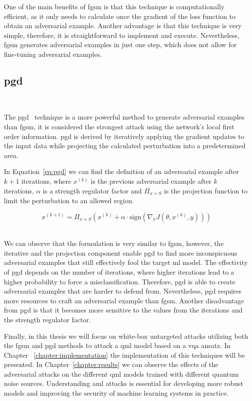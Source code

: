 One of the main benefits of \ac{fgsm} is that this technique
is computationally efficient, as it only needs to calculate
once the gradient of the loss function to obtain an adversarial
example. Another advantage is that this technique is very simple,
therefore, it is straightforward to implement and execute.
Nevertheless, \ac{fgsm} generates adversarial examples in just
one step, which does not allow for fine-tuning adversarial
examples. \

\subsection{\acl{pgd}}\label{subsection:pgd} \

The \ac{pgd}~\cite{madry_towards_2019} technique is a more
powerful method to generate adversarial examples than \ac{fgsm},
it is considered the strongest attack using the network's local
first order information. \ac{pgd} is derived by iteratively
applying the gradient updates to the input data while projecting
the calculated perturbation into a predetermined area. \

In Equation~\ref{eq:pgd} we can find the definition of an
adversarial example after \(k+1\) iterations, where \(x^{(k)}\)
is the previous adversarial example after \(k\) iterations,
\(\alpha\) is a strength regulator factor and \(\Pi_{x+S}\)
is the projection function to limit the perturbation to
an allowed region. \

\begin{equation}\label{eq:pgd}
  x^{(k+1)} = \Pi_{x+S} \left( x^{(k)} + \alpha \cdot \text{sign}(\nabla_x J(\theta, x^{(k)}, y)) \right)
\end{equation} \

We can observe that the formulation is very similar to \ac{fgsm},
however, the iterative and the projection component enable \ac{pgd}
to find more inconspicuous adversarial examples that still effectively
fool the target \ac{ml} model. The effectivity of \ac{pgd} depends
on the number of iterations, where higher iterations lead to a higher
probability to force a misclassification. Therefore, \ac{pgd} is able to
create adversarial examples that are harder to defend from.
Nevertheless, \ac{pgd} requires more resources to craft an
adversarial example than \ac{fgsm}. Another disadvantage from
\ac{pgd} is that it becomes more sensitive to the values from
the iterations and the strength regulator factor. \

Finally, in this thesis we will focus on white-box untargeted attacks
utilizing both the \ac{fgsm} and \ac{pgd} methods to attack
a \ac{qml} model based on a \ac{vqa} ansatz. In Chapter
~\ref{chapter:implementation} the implementation of this techniques
will be presented. In Chapter~\ref{chapter:results} we can observe
the effects of the adversarial attacks on the different \ac{qml}
models trained with different quantum noise sources. Understanding
\ac{aml} attacks is essential for developing more robust models
and improving the security of machine learning systems in practice. \